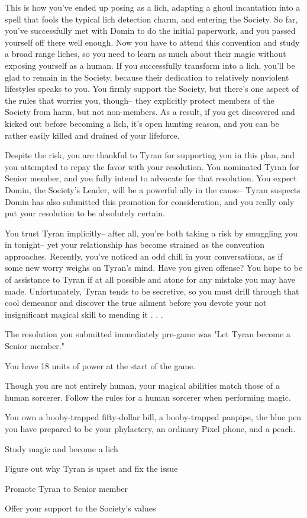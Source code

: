 \documentclass[char]{Sel}
\begin{document}
This is how you've ended up posing as a lich, adapting a ghoul incantation into a spell that fools the typical lich detection charm, and entering the Society. So far, you've successfully met with Domin to do the initial paperwork, and you passed yourself off there well enough. Now you have to attend this convention and study a broad range liches, so you need to learn as much about their magic without exposing yourself as a human. If you successfully transform into a lich, you'll be glad to remain in the Society, because their dedication to relatively nonviolent lifestyles speaks to you. You firmly support the Society, but there's one aspect of the rules that worries you, though-- they explicitly protect members of the Society from harm, but not non-members. As a result, if you get discovered and kicked out before becoming a lich, it's open hunting season, and you can be rather easily killed and drained of your lifeforce.

Despite the risk, you are thankful to Tyran for supporting you in this plan, and you attempted to repay the favor with your resolution. You nominated Tyran for Senior member, and you fully intend to advocate for that resolution. You expect Domin, the Society’s Leader, will be a powerful ally in the cause-- Tyran suspects Domin has also submitted this promotion for consideration, and you really only put your resolution to be absolutely certain.

You trust Tyran implicitly-- after all, you're both taking a risk by smuggling you in tonight-- yet your relationship has become strained as the convention approaches. Recently, you've noticed an odd chill in your conversations, as if some new worry weighs on Tyran's mind. Have you given offense? You hope to be of assistance to Tyran if at all possible and atone for any mistake you may have made. Unfortunately, Tyran tends to be secretive, so you must drill through that cool demeanor and discover the true ailment before you devote your not insignificant magical skill to mending it . . .

\begin{itemz}[Notes]
  \item The resolution you submitted immediately pre-game was "Let Tyran become a Senior member."
      \item You have 18 units of power at the start of the game.
   \item Though you are not entirely human, your magical abilities match those of a human sorcerer. Follow the rules for a human sorcerer when performing magic.
   \item You own a booby-trapped fifty-dollar bill, a booby-trapped panpipe, the blue pen you have prepared to be your phylactery, an ordinary Pixel phone, and a peach.
    \end{itemz}
   
  
    
 \begin{itemz}[Goals]
\item Study magic and become a lich
\item Figure out why Tyran is upset and fix the issue
\item Promote Tyran to Senior member 
\item Offer your support to the Society's values
\end{itemz}
\end{document}
